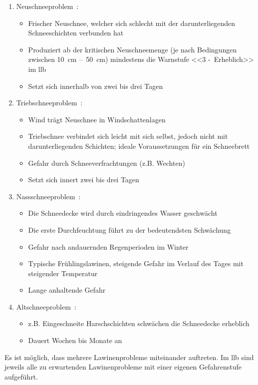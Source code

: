 \begin{enumerate}
  \item Neuschneeproblem~\cite{harveyrhynerschweizerlawinenkunde}\cite{achtunglawine}:
  \begin{itemize}
    \item Frischer Neuschnee, welcher sich schlecht mit der darunterliegenden Schneeschichten verbunden hat
    \item Produziert ab der kritischen Neuschneemenge (je nach Bedingungen zwischen \qty{10}{cm} --~\qty{50}{cm}) mindestens die Warnstufe <<3 -~Erheblich>> im \acrfull{llb}
    \item Setzt sich innerhalb von zwei bis drei Tagen
  \end{itemize}
  \item Triebschneeproblem~\cite{harveyrhynerschweizerlawinenkunde}\cite{achtunglawine}:
  \begin{itemize}
    \item Wind trägt Neuschnee in Windschattenlagen
    \item Triebschnee verbindet sich leicht mit sich selbst, jedoch nicht mit darunterliegenden Schichten; ideale Voraussetzungen für ein Schneebrett
    \item Gefahr durch Schneeverfrachtungen (z.B. Wechten)
    \item Setzt sich innert zwei bis drei Tagen
  \end{itemize}
  \item Nassschneeproblem~\cite{harveyrhynerschweizerlawinenkunde}\cite{achtunglawine}:
  \begin{itemize}
    \item Die Schneedecke wird durch eindringendes Wasser geschwächt
    \item Die erste Durchfeuchtung führt zu der bedeutendsten Schwächung
    \item Gefahr nach andauernden Regenperioden im Winter
    \item Typische Frühlingslawinen, steigende Gefahr im Verlauf des Tages mit steigender Temperatur
    \item Lange anhaltende Gefahr
  \end{itemize}
  \item Altschneeproblem~\cite{harveyrhynerschweizerlawinenkunde}\cite{achtunglawine}:
  \begin{itemize}
    \item z.B. Eingeschneite Harschschichten schwächen die Schneedecke erheblich
    \item Dauert Wochen bis Monate an
  \end{itemize}
\end{enumerate}
Es ist möglich, dass mehrere Lawinenprobleme miteinander auftreten. Im \gls{llb} sind jeweils alle zu erwartenden Lawinenprobleme mit einer eigenen Gefahrenstufe aufgeführt.~\cite{slfTypischeLawinenprobleme}


